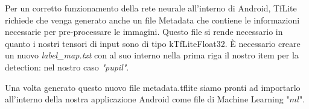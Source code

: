 Per un corretto funzionamento della rete neurale all'interno di Android, TfLite richiede che venga generato anche un file Metadata che contiene le informazioni necessarie per pre-processare le immagini. Questo file si rende necessario in quanto i nostri tensori di input sono di tipo kTfLiteFloat32. È necessario creare un nuovo \textit{label\_map.txt} con al suo interno nella prima riga il nostro item per la detection: nel nostro caso \textit{"pupil"}.

Una volta generato questo nuovo file metadata.tflite siamo pronti ad importarlo all'interno della nostra applicazione Android come file di Machine Learning "$ml$".